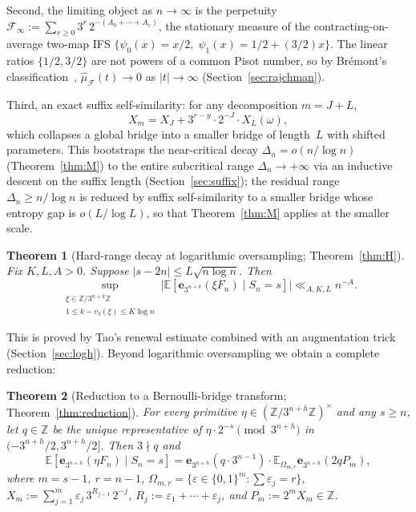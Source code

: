 \documentclass[11pt,a4paper]{amsart}
\theoremstyle{plain}
\newtheorem{theorem}{Theorem}[section]
\theoremstyle{definition}
\newcommand{\Z}{\mathbb{Z}}
\newcommand{\E}{\mathbb{E}}
\begin{document}
Second, the limiting object as $n\to\infty$ is the perpetuity
$\mathcal F_\infty:=\sum_{r\ge 0}3^r\,2^{-(A_0+\cdots+A_r)}$, the stationary
measure of the contracting-on-average two-map IFS
$\{\psi_0(x)=x/2,\;\psi_1(x)=1/2+(3/2)x\}$.
The linear ratios $\{1/2,3/2\}$ are not powers of a common Pisot
number, so by Br\'emont's classification~\cite[Theorem 2.5]{Bremont},
$\widehat\mu_{\mathcal F}(t)\to 0$ as $|t|\to\infty$ (Section~\ref{sec:rajchman}).

Third, an exact suffix self-similarity: for any decomposition $m=J+L$,
\begin{equation}\label{eq:proofoutline-3}
X_m=X_J+3^{r-y}\cdot 2^{-J}\cdot X_L(\omega),
\end{equation}
which collapses a global bridge into a smaller bridge of length~$L$
with shifted parameters.
This bootstraps the near-critical decay $\Delta_n=o(n/\log n)$
(Theorem~\ref{thm:M}) to the entire subcritical range $\Delta_n\to+\infty$
via an inductive descent on the suffix length
(Section~\ref{sec:suffix}); the residual range $\Delta_n\ge n/\log n$
is reduced by suffix self-similarity to a smaller bridge whose entropy
gap is $o(L/\log L)$, so that Theorem~\ref{thm:M} applies at the smaller scale.

\begin{theorem}[Hard-range decay at logarithmic oversampling;
Theorem~\ref{thm:H}]\label{thm:HIntro}
Fix $K,L,A>0$.
Suppose $|s-2n|\le L\sqrt{n\log n}$.
Then
$$
\sup_{\substack{\xi\in\Z/3^{n+k}\Z\\1\le k-v_3(\xi)\le K\log n}}
\bigl|\E[\mathbf e_{3^{n+k}}(\xi F_n)\mid S_n=s]\bigr|
\ll_{A,K,L} n^{-A}.
$$
\end{theorem}

This is proved by Tao's renewal estimate combined with an augmentation
trick (Section~\ref{sec:logh}).
Beyond logarithmic oversampling we obtain a complete reduction:

\begin{theorem}[Reduction to a Bernoulli-bridge transform; Theorem~\ref{thm:reduction}]
\label{thm:reductionIntro}
For every primitive $\eta\in(\Z/3^{n+h}\Z)^\times$ and any $s\ge n$,
let $q\in\Z$ be the unique representative of $\eta\cdot 2^{-s}\pmod{3^{n+h}}$
in $(-3^{n+h}/2,3^{n+h}/2]$.
Then $3\nmid q$ and
$$
\E[\mathbf e_{3^{n+h}}(\eta F_n)\mid S_n=s]
=\mathbf e_{3^{n+h}}(q\cdot 3^{n-1})\cdot
\E_{\Omega_{m,r}}\mathbf e_{3^{n+h}}(2qP_m),
$$
where $m=s-1$, $r=n-1$, $\Omega_{m,r}=\{\varepsilon\in\{0,1\}^m:\sum\varepsilon_j=r\}$,
$X_m:=\sum_{j=1}^m\varepsilon_j\,3^{R_{j-1}}\,2^{-j}$, $R_j:=\varepsilon_1+\cdots+\varepsilon_j$,
and $P_m:=2^mX_m\in\Z$.
\end{theorem}
\end{document}
